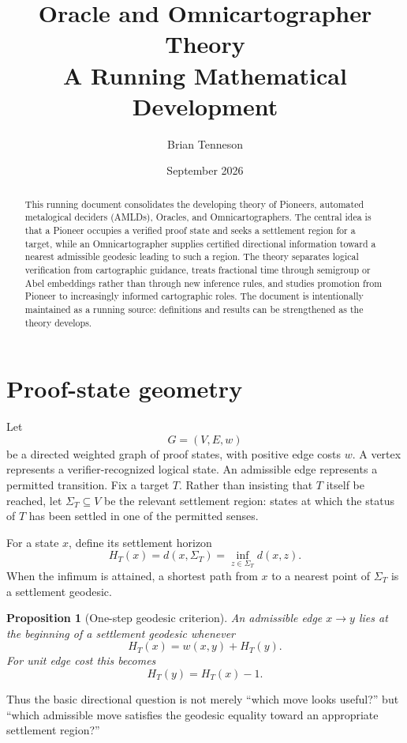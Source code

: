 \documentclass[11pt]{article}
\title{\textbf{Oracle and Omnicartographer Theory}\\[0.35em]\large A Running Mathematical Development}
\author{Brian Tenneson}
\date{September 2026}
\newtheorem{proposition}[theorem]{Proposition}
\begin{document}
\maketitle

\begin{abstract}
This running document consolidates the developing theory of Pioneers, automated metalogical deciders (AMLDs), Oracles, and Omnicartographers. The central idea is that a Pioneer occupies a verified proof state and seeks a settlement region for a target, while an Omnicartographer supplies certified directional information toward a nearest admissible geodesic leading to such a region. The theory separates logical verification from cartographic guidance, treats fractional time through semigroup or Abel embeddings rather than through new inference rules, and studies promotion from Pioneer to increasingly informed cartographic roles. The document is intentionally maintained as a running source: definitions and results can be strengthened as the theory develops.
\end{abstract}

\tableofcontents

\section{Proof-state geometry}
Let
\[
G=(V,E,w)
\]
be a directed weighted graph of proof states, with positive edge costs $w$. A vertex represents a verifier-recognized logical state. An admissible edge represents a permitted transition. Fix a target $T$. Rather than insisting that $T$ itself be reached, let $\Sigma_T\subseteq V$ be the relevant settlement region: states at which the status of $T$ has been settled in one of the permitted senses.

For a state $x$, define its settlement horizon
\[
H_T(x)=d(x,\Sigma_T)=\inf_{z\in\Sigma_T} d(x,z).
\]
When the infimum is attained, a shortest path from $x$ to a nearest point of $\Sigma_T$ is a settlement geodesic.

\begin{proposition}[One-step geodesic criterion]
An admissible edge $x\to y$ lies at the beginning of a settlement geodesic whenever
\[
H_T(x)=w(x,y)+H_T(y).
\]
For unit edge cost this becomes
\[
H_T(y)=H_T(x)-1.
\]
\end{proposition}

Thus the basic directional question is not merely ``which move looks useful?'' but ``which admissible move satisfies the geodesic equality toward an appropriate settlement region?''
\end{document}
